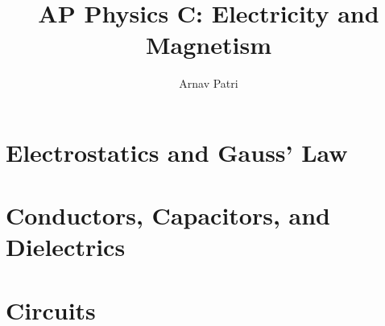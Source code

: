 \documentclass[A4, 12pt]{report}
\title{AP Physics C: Electricity and Magnetism}
\author{Arnav Patri}
\begin{document}
	\maketitle
	\chapter{Electrostatics and Gauss' Law}
		
	\chapter{Conductors, Capacitors, and Dielectrics}
		
	\chapter{Circuits}
		
\end{document}
